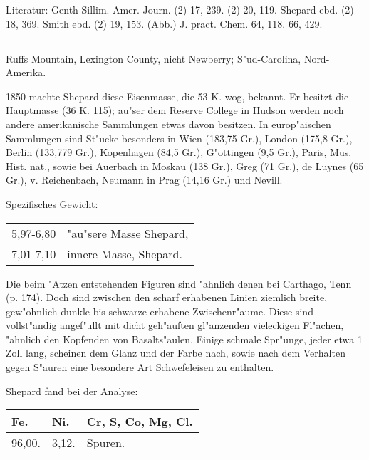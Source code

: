 \documentclass[a4paper, 11pt, oneside]{article}
\begin{document}
\normalsize
Literatur: Genth Sillim. Amer. Journ. (2) 17, 239. (2) 20, 119. Shepard ebd. (2) 18, 369. Smith ebd. (2) 19, 153. (Abb.) J. pract. Chem. 64, 118. 66, 429.

\subsection{}
\LARGE
\paragraph{}
Ruffs Mountain, Lexington County, nicht Newberry; S"ud-Carolina, Nord-Amerika.

1850 machte Shepard diese Eisenmasse, die 53 K. wog, bekannt. Er besitzt die Hauptmasse (36 K. 115); au"ser dem Reserve College in Hudson werden noch andere amerikanische Sammlungen etwas davon besitzen. In europ"aischen Sammlungen sind St"ucke besonders in Wien (183,75 Gr.), London (175,8 Gr.), Berlin (133,779 Gr.), Kopenhagen (84,5 Gr.), G"ottingen (9,5 Gr.), Paris, Mus. Hist. nat., sowie bei Auerbach in Moskau (138 Gr.), Greg (71 Gr.), de Luynes (65 Gr.), v. Reichenbach, Neumann in Prag (14,16 Gr.) und Nevill.

Spezifisches Gewicht:  
\begin{table}[!ht]
    \centering\swabfamily\Large
    \begin{tabular}{l l}
        5,97-6,80 & "au"sere Masse Shepard,\\
        7,01-7,10 & innere Masse, Shepard.
    \end{tabular}
\end{table}

Die beim "Atzen entstehenden Figuren sind "ahnlich denen bei Carthago, Tenn (p. 174). Doch sind zwischen den scharf erhabenen Linien ziemlich breite, gew"ohnlich dunkle bis schwarze erhabene Zwischenr"aume. Diese sind vollst"andig angef"ullt mit dicht geh"auften gl"anzenden vieleckigen Fl"achen, "ahnlich den Kopfenden von Basalts"aulen. Einige schmale Spr"unge, jeder etwa 1 Zoll lang, scheinen dem Glanz und der Farbe nach, sowie nach dem Verhalten gegen S"auren eine besondere Art Schwefeleisen zu enthalten.

Shepard fand bei der Analyse:
\begin{table}[H]
    \centering\swabfamily\Large
    \begin{tabular}{l l l}
        Fe. & Ni. & Cr, S, Co, Mg, Cl. \\ \hline
        96,00. & 3,12. & Spuren. \\
    \end{tabular}
\end{table}
\end{document}
